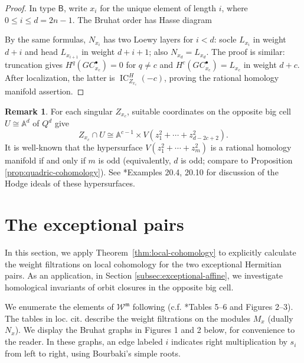 \documentclass[12pt]{amsart}
\theoremstyle{definition}
\newtheorem{remark}[theorem]{Remark}
\numberwithin{equation}{section}
\newcommand{\m}{\mathfrak m}
\newcommand{\W}{\mathscr W}
\begin{document}
\begin{proof}
In type $\mathsf B$, write $x_i$ for the unique element
of length $i$, where $0\leq i\leq d=2n-1$.
The Bruhat order has Hasse diagram
\begin{center}
\end{center}
By the same formulas, $N_{x_i}$ has two Loewy layers
for $i<d$: socle $L_{x_i}$ in weight $d+i$ and head
$L_{x_{i+1}}$ in weight $d+i+1$; also $N_{x_d}=L_{x_d}$.
The proof is similar: truncation gives
$H^q(GC_{x_c}^{\bullet})=0$ for $q\ne c$ and
$H^c(GC_{x_c}^{\bullet})=L_{x_c}$ in weight $d+c$.
After localization, the latter is
$\operatorname{IC}_{Z_{x_c}}^H(-c)$, proving the
rational homology manifold assertion.
\end{proof}

\begin{remark}
For each singular $Z_{x_c}$, suitable coordinates on the
opposite big cell $U\cong\mathbb A^d$ of $Q^d$ give
\[
Z_{x_c}\cap U\cong
\mathbb A^{c-1}\times V(z_1^2+\cdots+z_{d-2c+2}^2).
\]
It is well-known that the hypersurface $V(z_1^2+\cdots+z_m^2)$ is a rational homology manifold if and only if $m$ is odd (equivalently, $d$ is odd; compare to Proposition \ref{prop:quadric-cohomology}). 
See \cite{MP1}*{Examples 20.4, 20.10} for discussion of the Hodge ideals of these hypersurfaces.
\end{remark}


\raggedbottom
\section{The exceptional pairs}\label{sec:exceptional-pairs}

In this section, we apply Theorem~\ref{thm:local-cohomology} to explicitly calculate the weight filtrations on local cohomology for the two exceptional
Hermitian pairs. As an application, in Section \ref{subsec:exceptional-affine}, we investigate homological invariants of orbit closures in the opposite big cell.


We enumerate the elements of $\W^{\m}$ following \cite[Tables 7.1, 7.2]{cisWeight}  (c.f. \cite{Collingwood1985}*{Tables 5--6 and Figures 2--3}). The tables in loc. cit. describe the weight filtrations on the modules $M_x$ (dually $N_x$). We display the Bruhat graphs in Figures 1 and 2 below, for convenience to the reader. In these graphs, an edge labeled $i$ indicates right multiplication
by $s_i$ from left to right, using Bourbaki's simple roots.
\end{document}

